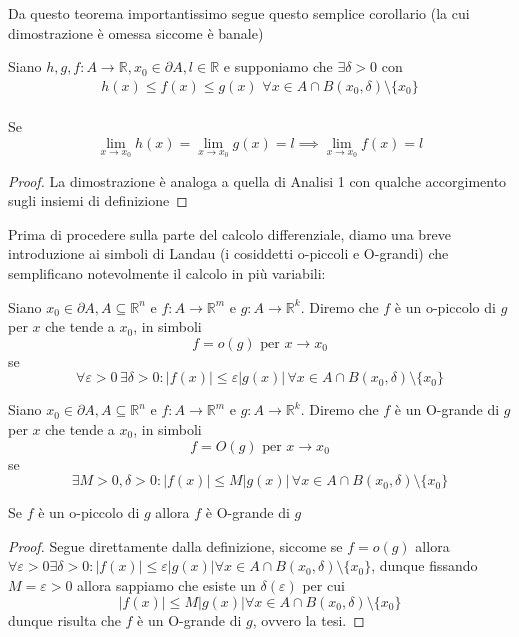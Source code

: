 \documentclass[openany, italian]{book}
\begin{document}
\noindent Da questo teorema importantissimo segue questo semplice corollario (la cui dimostrazione è omessa siccome è banale)
\begin{theorem}
Siano $h, g, f: A \to \mathbb{R}, x_0 \in \partial A, l \in \mathbb{R}$ e supponiamo che $\exists \delta > 0$ con
\begin{align*}
h(x) \leq f(x) \leq g(x) \, \, \forall x \in A \cap B(x_0, \delta) \setminus \{ x_0 \}
\end{align*} \\
Se 
$$\lim\limits_{x \to x_0} h(x) = \lim\limits_{x \to x_0} g(x) = l \implies \lim_{x \to x_0} f(x) = l$$
\end{theorem}
\begin{proof}
La dimostrazione è analoga a quella di Analisi 1 con qualche accorgimento sugli insiemi di definizione
\end{proof}
\noindent Prima di procedere sulla parte del calcolo differenziale, diamo una breve introduzione ai simboli di Landau (i cosiddetti o-piccoli e O-grandi) che semplificano notevolmente il calcolo in più variabili:
\begin{definition}[o-piccolo]
Siano $x_0 \in \partial A, A \subseteq \mathbb{R}^n$ e $f: A \to \mathbb{R}^m$ e $g: A \to \mathbb{R}^k$. Diremo che $f$ è un o-piccolo di $g$ per $x$ che tende a $x_0$, in simboli
$$
f = o(g) \text{ per } x \to x_0
$$
se $$\forall \varepsilon > 0 \, \exists \delta > 0 : |f(x)| \leq \varepsilon |g(x)| \, \forall x \in A \cap B(x_0, \delta) \setminus \{ x_0 \}$$
\end{definition}
\begin{definition}[O-grande]
Siano $x_0 \in \partial A, A \subseteq \mathbb{R}^n$ e $f: A \to \mathbb{R}^m$ e $g: A \to \mathbb{R}^k$. Diremo che $f$ è un O-grande di $g$ per $x$ che tende a $x_0$, in simboli
$$
f = O(g) \text{ per } x \to x_0
$$
se $$\exists M > 0, \delta > 0 : |f(x)| \leq M|g(x)| \, \forall x \in A \cap B(x_0, \delta) \setminus \{ x_0 \} $$
\end{definition}
\begin{exercise}
Se $f$ è un o-piccolo di $g$ allora $f$ è O-grande di $g$
\end{exercise}
\begin{proof}
Segue direttamente dalla definizione, siccome se $f = o(g)$ allora $\forall \varepsilon > 0 \exists \delta > 0: |f(x)| \leq \varepsilon |g(x)| \forall x \in A \cap B(x_0, \delta) \setminus \{ x_0 \}$, dunque fissando $M = \varepsilon > 0$ allora sappiamo che esiste un $\delta(\varepsilon)$ per cui
$$
|f(x)| \leq M |g(x)| \forall x \in A \cap B(x_0, \delta) \setminus \{ x_0 \}
$$ 
dunque risulta che $f$ è un O-grande di $g$, ovvero la tesi.
\end{proof}
\end{document}
